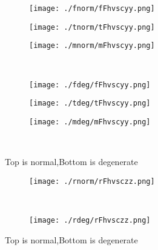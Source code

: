 \documentclass[aps,floats,floatfix,nofootinbib]{revtex4-1}
\begin{document}
\begin{center}
\begin{figure}
\begin{subfigure}{0.3\textwidth}
\texttt{[image: ./fnorm/fFhvscyy.png]}
\label{}
\end{subfigure}
\begin{subfigure}{0.3\textwidth}
\texttt{[image: ./tnorm/tFhvscyy.png]}
\label{}
\end{subfigure}
\begin{subfigure}{0.3\textwidth}
\texttt{[image: ./mnorm/mFhvscyy.png]}
\label{}
\end{subfigure}\\
\begin{subfigure}{0.3\textwidth}
\texttt{[image: ./fdeg/fFhvscyy.png]}
\label{}
\end{subfigure}
\begin{subfigure}{0.3\textwidth}
\texttt{[image: ./tdeg/tFhvscyy.png]}
\label{}
\end{subfigure}
\begin{subfigure}{0.3\textwidth}
\texttt{[image: ./mdeg/mFhvscyy.png]}
\label{}
\end{subfigure}\\
\caption{Top is normal,Bottom is degenerate}
\end{figure}
\end{center}

\begin{center}
\begin{figure}
\begin{subfigure}{0.95\textwidth}
\texttt{[image: ./rnorm/rFhvsczz.png]}
\label{}
\end{subfigure}\\
\begin{subfigure}{0.95\textwidth}
\texttt{[image: ./rdeg/rFhvsczz.png]}
\label{}
\end{subfigure}
\caption{Top is normal,Bottom is degenerate}
\end{figure}
\end{center}
\end{document}
